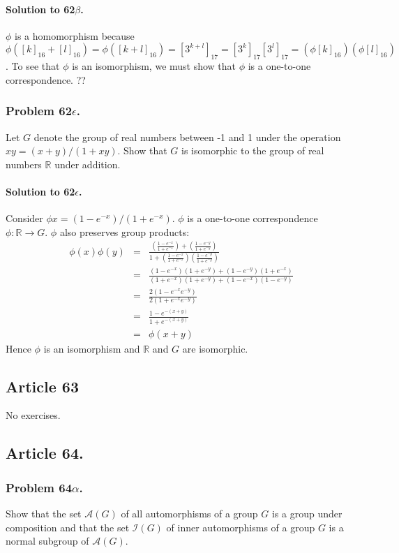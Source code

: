 \paragraph*{Solution to 62$\beta$.}
$\phi$ is a homomorphism because $\phi([k]_{16} + [l]_{16}) = \phi([k+l]_{16}) = [3^{k+l}]_{17}
= [3^k]_{17}[3^l]_{17} = (\phi [k]_{16})(\phi[l]_{16})$. To see that $\phi$ is an isomorphism,
we must show that $\phi$ is a one-to-one correspondence. ??

\subsubsection{Problem 62$\epsilon$.}
Let $G$ denote the group of real numbers between -1 and 1 under the operation
$x y = (x+y)/(1+xy)$. Show that $G$ is isomorphic to the group of real numbers
$\mathbb{R}$ under addition.

\paragraph*{Solution to 62$\epsilon$.}
Consider $\phi x = (1-e^{-x}) / (1 + e^{-x})$. $\phi$ is a one-to-one correspondence
$\phi : \mathbb{R} \rightarrow G$. $\phi$ also preserves group products:
\begin{eqnarray*}
\phi(x)\phi(y) & = & \frac{(\frac{1-e^{-x}}{1+e^{-x}}) + (\frac{1-e^{-y}}{1+e^{-y}})}
{1 + (\frac{1-e^{-x}}{1+e^{-x}})(\frac{1-e^{-y}}{1+e^{-y}})} \\
& = & \frac{(1-e^{-x})(1+e^{-y}) + (1-e^{-y})(1+e^{-x})}
{(1+e^{-x})(1+e^{-y})+(1-e^{-x})(1-e^{-y})} \\
& = & \frac{2(1-e^{-x}e^{-y})}{2(1 + e^{-x}e^{-y})} \\
& = & \frac{1 - e^{-(x+y)}}{1+e^{-(x+y)}} \\
& = & \phi (x+y)
\end{eqnarray*}
Hence $\phi$ is an isomorphism and $\mathbb{R}$ and $G$ are isomorphic.

\subsection{Article 63}

No exercises.

\subsection{Article 64.}

\subsubsection{Problem 64$\alpha$.}
Show that the set $\mathcal{A}(G)$ of all automorphisms of a group $G$
is a group under composition and that the set $\mathcal{I}(G)$ of inner
automorphisms of a group $G$ is a normal subgroup of $\mathcal{A}(G)$.

